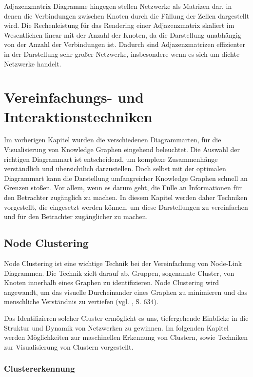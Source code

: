 Adjazenzmatrix Diagramme hingegen stellen Netzwerke als Matrizen dar, in denen die Verbindungen zwischen Knoten durch die Füllung der Zellen dargestellt wird. Die Rechenleistung für das Rendering einer Adjazenzmatrix skaliert im Wesentlichen linear mit der Anzahl der Knoten, da die Darstellung unabhängig von der Anzahl der Verbindungen ist. Dadurch sind Adjazenzmatrizen effizienter in der Darstellung sehr großer Netzwerke, insbesondere wenn es sich um dichte Netzwerke handelt. 

\section{Vereinfachungs- und Interaktionstechniken}

Im vorherigen Kapitel wurden die verschiedenen Diagrammarten, für die Visualisierung von Knowledge Graphen eingehend beleuchtet. Die Auswahl der richtigen Diagrammart ist entscheidend, um komplexe Zusammenhänge verständlich und übersichtlich darzustellen. Doch selbst mit der optimalen Diagrammart kann die Darstellung umfangreicher Knowledge Graphen schnell an Grenzen stoßen. Vor allem, wenn es darum geht, die Fülle an Informationen für den Betrachter zugänglich zu machen. In diesem Kapitel werden daher Techniken vorgestellt, die eingesetzt werden können, um diese Darstellungen zu vereinfachen und für den Betrachter zugänglicher zu machen.

\subsection{Node Clustering}

Node Clustering ist eine wichtige Technik bei der Vereinfachung von Node-Link Diagrammen. Die Technik zielt darauf ab, Gruppen, sogenannte Cluster, von Knoten innerhalb eines Graphen zu identifizieren. Node Clustering wird angewandt, um das visuelle Durcheinander eines Graphen zu minimieren und das menschliche Verständnis zu vertiefen (vgl. \cite{chen:SurveyGraphVisualization}, S. 634).

Das Identifizieren solcher Cluster ermöglicht es uns, tiefergehende Einblicke in die Struktur und Dynamik von Netzwerken zu gewinnen. Im folgenden Kapitel werden Möglichkeiten zur maschinellen Erkennung von Clustern, sowie Techniken zur Visualisierung von Clustern vorgestellt.

\subsubsection{Clustererkennung}

